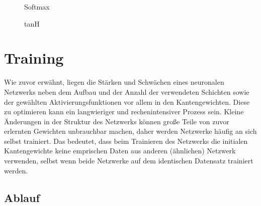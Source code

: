 \begin{figure}[H]
    \begin{minipage}{0.45\textwidth}
        \begin{center}
        \end{center}
        \caption{Softmax}
    \end{minipage}\hfill
    \begin{minipage}{0.45\textwidth}
        \begin{center}
        \end{center}
        \caption{tanH}
    \end{minipage}
\end{figure}

\section{Training}\label{sec:training}

Wie zuvor erwähnt, liegen die Stärken und Schwächen eines neuronalen Netzwerks
neben dem Aufbau und der Anzahl der verwendeten Schichten sowie der gewählten
Aktivierungsfunktionen vor allem in den Kantengewichten. Diese zu optimieren
kann ein langwieriger und rechenintensiver Prozess sein. Kleine Änderungen in
der Struktur des Netzwerks können große Teile von zuvor erlernten Gewichten
unbrauchbar machen, daher werden Netzwerke häufig an sich selbst trainiert.
Das bedeutet, dass beim Trainieren des Netzwerks die initialen
Kantengewichte keine emprischen Daten aus anderen (ähnlichen) Netzwerk verwenden,
selbst wenn beide Netzwerke auf dem identischen Datensatz trainiert werden.

\subsection{Ablauf}


